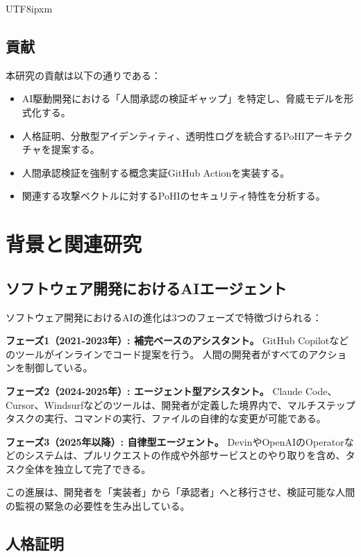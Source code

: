 \documentclass[a4paper,10pt]{article}
\begin{document}
\begin{CJK}{UTF8}{ipxm}
\subsection{貢献}

本研究の貢献は以下の通りである：
\begin{itemize}
    \item AI駆動開発における「人間承認の検証ギャップ」を特定し、脅威モデルを形式化する。
    \item 人格証明、分散型アイデンティティ、透明性ログを統合するPoHIアーキテクチャを提案する。
    \item 人間承認検証を強制する概念実証GitHub Actionを実装する。
    \item 関連する攻撃ベクトルに対するPoHIのセキュリティ特性を分析する。
\end{itemize}

\section{背景と関連研究}

\subsection{ソフトウェア開発におけるAIエージェント}

ソフトウェア開発におけるAIの進化は3つのフェーズで特徴づけられる：

\textbf{フェーズ1（2021-2023年）: 補完ベースのアシスタント。}
GitHub Copilotなどのツールがインラインでコード提案を行う。
人間の開発者がすべてのアクションを制御している。

\textbf{フェーズ2（2024-2025年）: エージェント型アシスタント。}
Claude Code、Cursor、Windsurfなどのツールは、開発者が定義した境界内で、マルチステップタスクの実行、コマンドの実行、ファイルの自律的な変更が可能である。

\textbf{フェーズ3（2025年以降）: 自律型エージェント。}
DevinやOpenAIのOperatorなどのシステムは、プルリクエストの作成や外部サービスとのやり取りを含め、タスク全体を独立して完了できる。

この進展は、開発者を「実装者」から「承認者」へと移行させ、検証可能な人間の監視の緊急の必要性を生み出している。

\subsection{人格証明}


\end{CJK}
\end{document}
